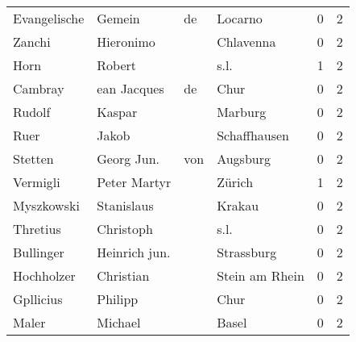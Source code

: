 \begin{center}
\begin{tiny}
\begin{longtabu}{llllrr}
             Evangelische &                             Gemein &          de &                                     Locarno &          0 &         2 \\
                   Zanchi &                          Hieronimo &             &                                   Chlavenna &          0 &         2 \\
                     Horn &                             Robert &             &                                        s.l. &          1 &         2 \\
                  Cambray &                        ean Jacques &          de &                                        Chur &          0 &         2 \\
                   Rudolf &                             Kaspar &             &                                     Marburg &          0 &         2 \\
                     Ruer &                              Jakob &             &                                Schaffhausen &          0 &         2 \\
                  Stetten &                        Georg  Jun. &         von &                                    Augsburg &          0 &         2 \\
                 Vermigli &                       Peter Martyr &             &                                      Zürich &          1 &         2 \\
               Myszkowski &                         Stanislaus &             &                                      Krakau &          0 &         2 \\
                 Thretius &                          Christoph &             &                                        s.l. &          0 &         2 \\
                Bullinger &                      Heinrich jun. &             &                                  Strassburg &          0 &         2 \\
               Hochholzer &                          Christian &             &                              Stein am Rhein &          0 &         2 \\
                Gpllicius &                            Philipp &             &                                        Chur &          0 &         2 \\
                    Maler &                            Michael &             &                                       Basel &          0 &         2 \\

\end{longtabu}
\end{tiny}
\end{center}
